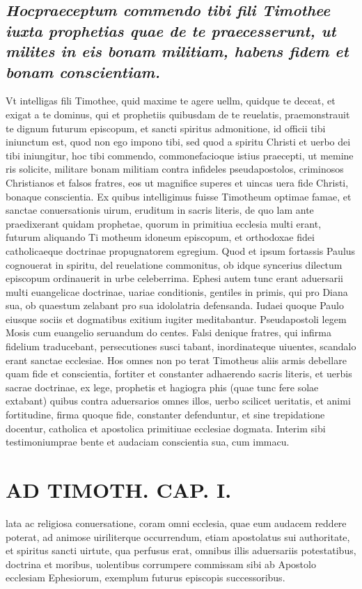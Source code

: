 \documentclass{article}
\begin{document}
\begin{pages}
\subsection*{\textit{Hocpraeceptum commendo tibi fili Timothee iuxta prophetias quae de te praecesserunt, ut milites in eis bonam militiam, habens fidem et bonam conscientiam. }}\pstart Vt intelligas fili Timothee, quid maxime te agere uellm, quidque te deceat, et exigat a te dominus, qui et prophetiis quibusdam de te reuelatis, praemonstrauit te dignum futurum episcopum, et sancti spiritus admonitione, id officii tibi iniunctum est, quod non ego impono tibi, sed quod a spiritu Christi et uerbo dei tibi iniungitur, hoc tibi commendo, commonefacioque istius praecepti, ut memine ris solicite, militare bonam militiam contra infideles pseudapostolos, criminosos Christianos et falsos fratres, eos ut magnifice superes et uincas uera fide Christi, bonaque conscientia. Ex quibus intelligimus fuisse Timotheum optimae famae, et sanctae conuersationis uirum, eruditum in sacris literis, de quo lam ante praedixerant quidam prophetae, quorum in primitiua ecclesia multi erant, futurum aliquando Ti motheum idoneum episcopum, et orthodoxae fidei catholicaeque doctrinae propugnatorem egregium. Quod et ipsum fortassis Paulus cognouerat in spiritu, del reuelatione commonitus, ob idque syncerius dilectum episcopum ordinauerit in urbe celeberrima. Ephesi autem tunc erant aduersarii multi euangelicae doctrinae, uariae conditionis, gentiles in primis, qui pro Diana sua, ob quaestum zelabant pro sua idololatria defensanda. Iudaei quoque Paulo eiusque sociis et dogmatibus exitium iugiter meditabantur. Pseudapostoli legem Mosis cum euangelio seruandum do centes. Falsi denique fratres, qui infirma fidelium traducebant, persecutiones susci tabant, inordinateque uiuentes, scandalo erant sanctae ecclesiae. Hos omnes non po terat Timotheus aliis armis debellare quam fide et conscientia, fortiter et constanter adhaerendo sacris literis, et uerbis sacrae doctrinae, ex lege, prophetis et hagiogra phis (quae tunc fere solae extabant) quibus contra aduersarios omnes illos, uerbo scilicet ueritatis, et animi fortitudine, firma quoque fide, constanter defenduntur, et sine trepidatione docentur, catholica et apostolica primitiuae ecclesiae dogmata. Interim sibi testimoniumprae bente et audaciam conscientia sua, cum immacu.  \pend
\section*{AD TIMOTH. CAP. I. }
\marginpar{[ p.479 ]}\pstart lata ac religiosa conuersatione, coram omni ecclesia, quae eum audacem reddere poterat, ad animose uiriliterque occurrendum, etiam apostolatus sui authoritate, et spiritus sancti uirtute, qua perfusus erat, omnibus illis aduersariis potestatibus, doctrina et moribus, uolentibus corrumpere commissam sibi ab Apostolo ecclesiam Ephesiorum, exemplum futurus episcopis successoribus.  \pend
{}
{}

\end{pages}
\end{document}
